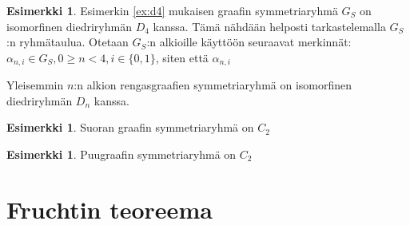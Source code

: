 \documentclass[a4paper, 12pt]{article}
\theoremstyle{definition}
\newtheorem{example}[mydef]{Esimerkki}
\theoremstyle{plain}
\begin{document}
\begin{example}
Esimerkin \ref{ex:d4} mukaisen graafin symmetriaryhmä $G_S$ on isomorfinen diedriryhmän $D_4$ kanssa. Tämä nähdään helposti tarkastelemalla $G_S$:n ryhmätaulua. Otetaan $G_S$:n alkioille käyttöön seuraavat merkinnät: $\alpha_{n, i} \in G_S, 0 \geq n \lt4, i \in \{0, 1\} $, siten että $\alpha_{n, i}$

Yleisemmin $n$:n alkion rengasgraafien symmetriaryhmä on isomorfinen diedriryhmän $D_n$ kanssa.
\end{example}

\begin{example}
Suoran graafin symmetriaryhmä on $C_2$
\end{example}

\begin{example}
Puugraafin symmetriaryhmä on $C_2$
\end{example}

\section{Fruchtin teoreema}
\end{document}

